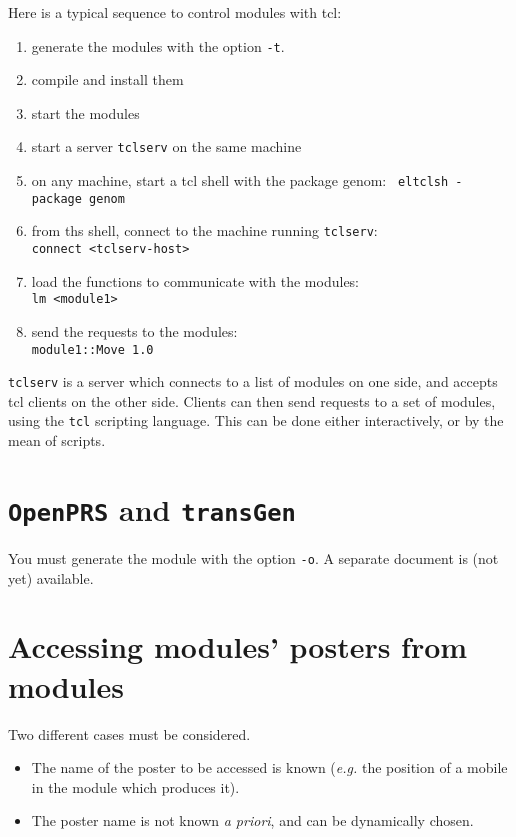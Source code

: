 Here is a typical sequence to control modules with tcl:

\begin{enumerate}
\item generate the modules with the  option \texttt{-t}. 
\item compile and install them
\item start the modules
\item start a server \texttt{tclserv} on the same machine
\item on any machine, start a tcl shell with the package genom: 
\texttt{      eltclsh -package genom}
\item from ths shell, connect to the machine running \texttt{tclserv}:\\
	\texttt{connect <tclserv-host>}
\item load the functions to communicate with the modules:\\
	\texttt{lm <module1>}
\item send the requests to the modules:\\
	\texttt{module1::Move 1.0}
\end{enumerate}


\texttt{tclserv} is  a server which  connects to  a  list of modules on  one
side, and accepts  tcl clients on  the other side.  Clients can then send
requests to  a   set   of   modules,  using the    \texttt{tcl}   scripting
language. This  can  be done  either interactively,  or  by the  mean  of
scripts.



\section{\texttt{OpenPRS} and \texttt{transGen}}
\label{sec|propice}

You must generate the module with the option \texttt{-o}.
A separate document is (not yet) available.


\section{Accessing modules' posters from modules}
\label{sec|posters}

Two different cases must be considered.
\begin{itemize}
\item The name of the poster to be accessed is known (\emph{e.g.} the
position of a mobile in the module which produces it).
\item The poster name is not known \emph{a priori}, and can be dynamically
chosen.
\end{itemize}

